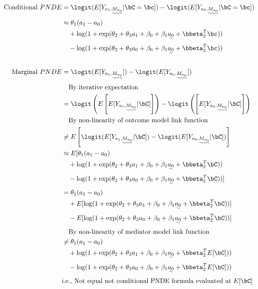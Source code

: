\documentclass[10pt]{article}
\begin{document}
\begin{align*}
  \text{Conditional }PNDE
  &= \logit(E[Y_{a_{1},\uwave{M_{a_{0}}}} | \bC = \bc]) - \logit(E[Y_{a_{0},\uwave{M_{a_{0}}}} | \bC = \bc])\\
  &\approx \theta_{1}(a_{1} - a_{0})\\
  &~~~ + \log(1 + \exp(\theta_{2} + \theta_{3}a_{1} + \beta_{0} + \beta_{1} \uwave{a_{0}} + \bbeta_{2}^T\bc))\\
  &~~~ - \log(1 + \exp(\theta_{2} + \theta_{3}a_{0} + \beta_{0} + \beta_{1} \uwave{a_{0}} + \bbeta_{2}^T\bc))\\
  \\
  \text{Marginal }PNDE
  &= \logit(E[Y_{a_{1},\uwave{M_{a_{0}}}}]) - \logit(E[Y_{a_{0},\uwave{M_{a_{0}}}}])\\
  &~~~\text{By iterative expectation}\\
  &= \logit\left(E \left[ E[Y_{a_{1},\uwave{M_{a_{0}}}} | \bC] \right]\right) - \logit\left(\left[ E[Y_{a_{0},\uwave{M_{a_{0}}}} | \bC] \right]\right)\\
  &~~~\text{By non-linearity of outcome model link function}\\
  &\ne E \left[ \logit(E[Y_{a_{1},\uwave{M_{a_{0}}}} | \bC]) - \logit(E[Y_{a_{0},\uwave{M_{a_{0}}}} | \bC]) \right]\\
  &\approx E[ \theta_{1}(a_{1} - a_{0})\\
  &~~~ + \log(1 + \exp(\theta_{2} + \theta_{3}a_{1} + \beta_{0} + \beta_{1} \uwave{a_{0}} + \bbeta_{2}^T\bC))\\
  &~~~ - \log(1 + \exp(\theta_{2} + \theta_{3}a_{0} + \beta_{0} + \beta_{1} \uwave{a_{0}} + \bbeta_{2}^T\bC))]\\
  &= \theta_{1}(a_{1} - a_{0})\\
  &~~~ + E[\log(1 + \exp(\theta_{2} + \theta_{3}a_{1} + \beta_{0} + \beta_{1} \uwave{a_{0}} + \bbeta_{2}^T\bC))]\\
  &~~~ - E[\log(1 + \exp(\theta_{2} + \theta_{3}a_{0} + \beta_{0} + \beta_{1} \uwave{a_{0}} + \bbeta_{2}^T\bC))]\\
  &~~~\text{By non-linearity of mediator model link function}\\
  &\ne \theta_{1}(a_{1} - a_{0})\\
  &~~~ + \log(1 + \exp(\theta_{2} + \theta_{3}a_{1} + \beta_{0} + \beta_{1} \uwave{a_{0}} + \bbeta_{2}^TE[\bC]))\\
  &~~~ - \log(1 + \exp(\theta_{2} + \theta_{3}a_{0} + \beta_{0} + \beta_{1} \uwave{a_{0}} + \bbeta_{2}^TE[\bC]))\\
  &\text{i.e., Not equal not conditional PNDE formula evaluated at }E[\bC]\\
\end{align*}
\end{document}
